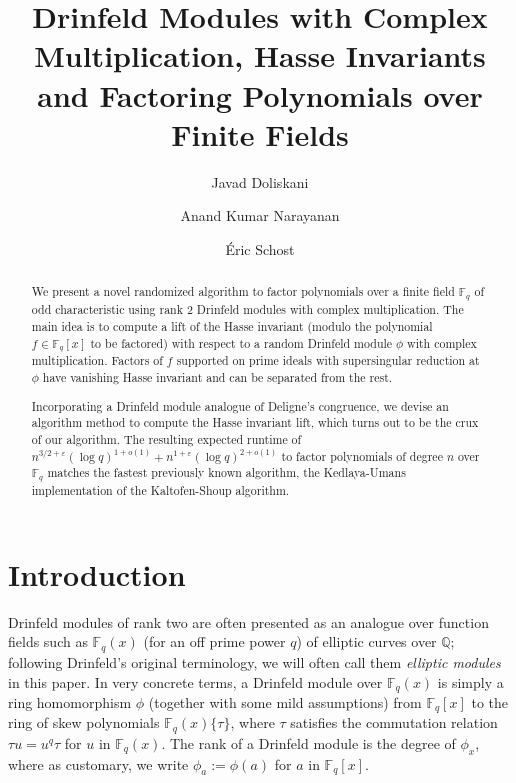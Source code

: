 \documentclass[12pt]{article}
\title{Drinfeld Modules with Complex Multiplication, Hasse Invariants and Factoring Polynomials over Finite Fields}
\author[1]{Javad Doliskani}
\author[2]{Anand Kumar Narayanan}
\author[3]{\'Eric Schost}
\affil[1]{\small Institute for Quantum Computing, University of Waterloo}
\affil[2]{\small Computing and Mathematical Sciences, Caltech}
\affil[3]{\small Cheriton Schoold of Computer Science, University of Waterloo}
\date{}
\theoremstyle{plain}
\theoremstyle{definition}
\newcommand{\ang}[1]{\{#1\}}
\def\Q{\ensuremath{\mathbb{Q}}}
\def\F{\ensuremath{\mathbb{F}}}
\begin{document}
\maketitle

\begin{abstract}
\noindent 
We present a novel randomized algorithm to factor polynomials over a
finite field $\F_q$ of odd characteristic using rank $2$ Drinfeld
modules with complex multiplication. The main idea is to compute a
lift of the Hasse invariant (modulo the polynomial $f \in \F_q[x]$
to be factored) with respect to a random Drinfeld module $\phi$ with
complex multiplication. Factors of $f$ supported on prime ideals
with supersingular reduction at $\phi$ have vanishing Hasse invariant
and can be separated from the rest.

Incorporating a Drinfeld module analogue of Deligne's congruence, we
devise an algorithm method to compute the Hasse invariant lift, which
turns out to be the crux of our algorithm. The resulting expected
runtime of $n^{3/2+\varepsilon} (\log q)^{1+o(1)}+n^{1+\varepsilon} (\log
q)^{2+o(1)}$ to factor polynomials of degree $n$ over $\F_q$ matches
the fastest previously known algorithm, the Kedlaya-Umans
implementation of the Kaltofen-Shoup algorithm.
\end{abstract}

\section{Introduction}

Drinfeld modules of rank two are often presented as an analogue over
function fields such as $\F_q(x)$ (for an off prime power $q$) of elliptic
curves over $\Q$; following Drinfeld's original terminology,
we will often call them {\em elliptic modules} in this paper. In very
concrete terms, a Drinfeld module over $\F_q(x)$ is simply a ring
homomorphism $\phi$ (together with some mild assumptions) from
$\F_q[x]$ to the ring of skew polynomials $\F_q(x)\ang{\tau}$, where
$\tau$ satisfies the commutation relation $\tau u = u^q \tau$ for $u$
in $\F_q(x)$. The rank of a Drinfeld module is the degree of
$\phi_x$, where as customary, we write $\phi_a:=\phi(a)$ for $a$ in $\F_q[x]$.
\end{document}
